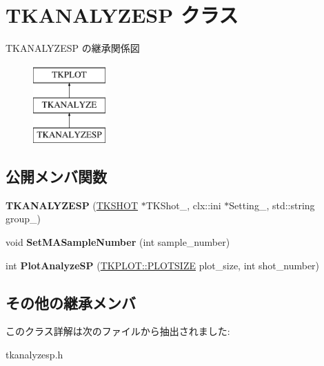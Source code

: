 \hypertarget{class_t_k_a_n_a_l_y_z_e_s_p}{}\section{T\+K\+A\+N\+A\+L\+Y\+Z\+E\+SP クラス}
\label{class_t_k_a_n_a_l_y_z_e_s_p}
T\+K\+A\+N\+A\+L\+Y\+Z\+E\+SP の継承関係図\begin{figure}[H]
\begin{center}
\leavevmode
\includegraphics[height=3.000000cm]{class_t_k_a_n_a_l_y_z_e_s_p}
\end{center}
\end{figure}
\subsection*{公開メンバ関数}
\begin{DoxyCompactItemize}
\item 
\mbox{\label{class_t_k_a_n_a_l_y_z_e_s_p_aa2acb0801185f8627c598bde433e53de}} 
{\bfseries T\+K\+A\+N\+A\+L\+Y\+Z\+E\+SP} (\hyperlink{class_t_k_s_h_o_t}{T\+K\+S\+H\+OT} $\ast$T\+K\+Shot\+\_\+, clx\+::ini $\ast$Setting\+\_\+, std\+::string group\+\_\+)
\item 
\mbox{\label{class_t_k_a_n_a_l_y_z_e_s_p_a960444249fc72e7b65c8d7176be04201}} 
void {\bfseries Set\+M\+A\+Sample\+Number} (int sample\+\_\+number)
\item 
\mbox{\label{class_t_k_a_n_a_l_y_z_e_s_p_a1b8358ffef8bcce3c2855f523247d9bb}} 
int {\bfseries Plot\+Analyze\+SP} (\hyperlink{class_t_k_p_l_o_t_a158082ae168750554cf23edde9a27416}{T\+K\+P\+L\+O\+T\+::\+P\+L\+O\+T\+S\+I\+ZE} plot\+\_\+size, int shot\+\_\+number)
\end{DoxyCompactItemize}
\subsection*{その他の継承メンバ}


このクラス詳解は次のファイルから抽出されました\+:\begin{DoxyCompactItemize}
\item 
tkanalyzesp.\+h\end{DoxyCompactItemize}
